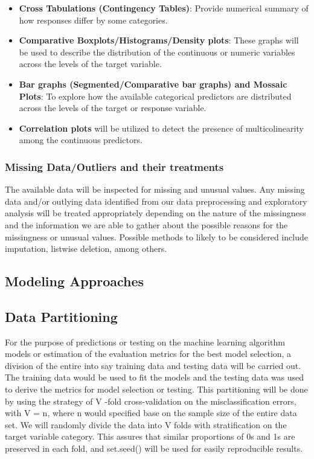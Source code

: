 \documentclass[
  10pt,
]{article}
\begin{document}
\begin{itemize}
\item
  \textbf{Cross Tabulations (Contingency Tables)}: Provide numerical summary of how responses differ by some categories.
\item
  \textbf{Comparative Boxplots/Histograms/Density plots}: These graphs will be used to describe the distribution of the continuous or numeric variables across the levels of the target variable.
\item
  \textbf{Bar graphs (Segmented/Comparative bar graphs) and Mossaic Plots}: To explore how the available categorical predictors are distributed across the levels of the target or response variable.
\item
  \textbf{Correlation plots} will be utilized to detect the presence of multicolinearity among the continuous predictors.
\end{itemize}

\hypertarget{missing-dataoutliers-and-their-treatments}{%
\subsubsection{Missing Data/Outliers and their treatments}\label{missing-dataoutliers-and-their-treatments}}

The available data will be inspected for missing and unusual values. Any missing data and/or outlying data identified from our data preprocessing and exploratory analysis will be treated appropriately depending on the nature of the missingness and the information we are able to gather about the possible reasons for the missingness or unusual values. Possible methods to likely to be considered include imputation, listwise deletion, among others.

\hypertarget{modeling-approaches}{%
\subsection{Modeling Approaches}\label{modeling-approaches}}

\hypertarget{data-partitioning}{%
\subsection{Data Partitioning}\label{data-partitioning}}

For the purpose of predictions or testing on the machine learning algorithm models or estimation of the evaluation metrics for the best model selection, a division of the entire into say training data and testing data will be carried out. The training data would be used to fit the models and the testing data was used to derive the metrics for model selection or testing. This partitioning will be done by using the strategy of V -fold cross-validation on the misclassification errors, with V = n, where n would specified base on the sample size of the entire data set. We will randomly divide the data into V folds with stratification on the target variable category. This assures that similar proportions of 0s and 1s are preserved in each fold, and set.seed() will be used for easily reproducible results.
\end{document}
